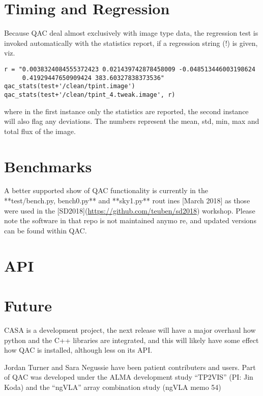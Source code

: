 \documentclass[11pt,twoside]{article}
\begin{document}
\section{Timing and Regression}

Because QAC deal almost exclusively with image type data, the regression test is invoked automatically
with the statistics report, if a regression string (!) is given, viz.

\footnotesize
\begin{verbatim}
r = "0.0038324084555372423 0.021439742878458009 -0.048513446003198624
     0.41929447650909424 383.60327838373536"
qac_stats(test+'/clean/tpint.image')
qac_stats(test+'/clean/tpint_4.tweak.image', r)
\end{verbatim}
\normalsize

where in the first instance only the statistics are reported, the second instance will also flag any deviations.
The numbers represent the mean, std, min, max and total flux of the image.

\section{Benchmarks}

A better supported show of QAC functionality is currently in the **test/bench.py, bench0.py** and **sky1.py** rout
ines [March 2018] as those were used in the
[SD2018](\url{https://github.com/teuben/sd2018}) workshop. Please note the software in that repo is not maintained anymo
re, and updated versions can be found
within QAC.

\section{API}




\section{Future}

CASA is a development project, the next
release will have a major overhaul how python and the C++ libraries
are integrated, and this will likely have some effect how QAC is
installed, although less on its API. 

\acknowledgements Jordan Turner and Sara Negussie have been patient contributers and users.
Part of QAC was developed under the ALMA development study ``TP2VIS''  (PI: Jin Koda) and
the ``ngVLA'' array combination study (ngVLA memo 54)


\end{document}
